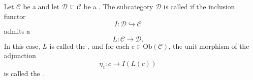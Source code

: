 \begin{definition} \label{definition:reflective_subcategory_of_a_category}
Let $\mathcal{C}$ be a  and let $\mathcal{D} \subseteq \mathcal{C}$ be a .  
The subcategory $\mathcal{D}$ is called  if the inclusion functor
$$ I : \mathcal{D} \hookrightarrow \mathcal{C} $$
admits a 
$$ L : \mathcal{C} \to \mathcal{D}.  $$
In this case, $L$ is called the , and for each $c \in \mathrm{Ob}(\mathcal{C})$, the unit morphism of the adjunction
$$ \eta_c : c \to I(L(c)) $$
is called the .
\end{definition}
